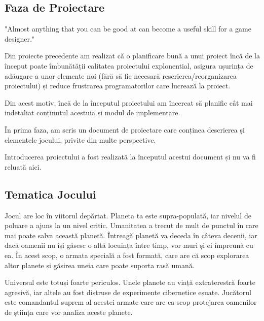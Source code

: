 \documentclass[12pt, a4paper]{article}
\begin{document}
	\subsection{Faza de Proiectare}
	
	"Almost anything that you can be good at can become a useful skill for a game designer." \cite{bookOfLenses}
	\newline
	
	Din proiecte precedente am realizat că o planificare bună a unui proiect încă de la început poate îmbunătății calitatea proiectului explonential, asigura ușurința de adăugare a unor elemente noi (fără să fie necesară rescrierea/reorganizarea proiectului) și reduce frustrarea programatorilor care lucrează la proiect.
	\newline
	
	Din acest motiv, încă de la începutul proiectului am încercat să planific cât mai indetaliat conținutul acestuia și modul de implementare.
	\newline
	
	În prima faza, am scris un document de proiectare care conținea descrierea și elementele jocului, privite din multe perspective.
	\newline
	
	Introducerea proiectului a fost realizată la începutul acestui document și nu va fi reluată aici.
	
	
	
	
	
	\subsection{Tematica Jocului}
	\label{section: gamePlot}
	
	Jocul are loc în viitorul depărtat. Planeta ta este supra-populată, iar nivelul de poluare a ajuns la un nivel critic. Umanitatea a trecut de mult de punctul în care mai poate salva această planetă. Întreagă planetă va deceda în câteva decenii, iar dacă oamenii nu își găsesc o altă locuința între timp, vor muri și ei împreună cu ea. În acest scop, o armata specială a fost formată, care are că scop explorarea altor planete și găsirea uneia care poate suporta rasă umană.
	\newline
	
	Universul este totuși foarte periculos. Unele planete au viață extraterestră foarte agresivă, iar altele au fost distruse de experimente cibernetice eșuate. Jucătorul este comandantul suprem al acestei armate care are ca scop protejarea oamenilor de știința care vor analiza aceste planete.
	\newline
	
\end{document}

